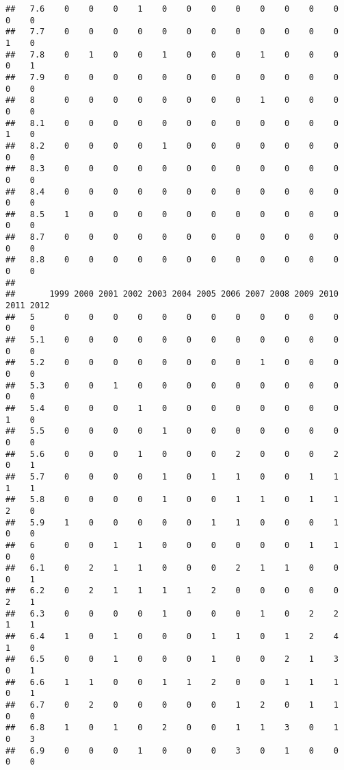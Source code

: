 \documentclass[
]{article}
\begin{document}
\begin{verbatim}
##   7.6    0    0    0    1    0    0    0    0    0    0    0    0    0    0
##   7.7    0    0    0    0    0    0    0    0    0    0    0    0    1    0
##   7.8    0    1    0    0    1    0    0    0    1    0    0    0    0    1
##   7.9    0    0    0    0    0    0    0    0    0    0    0    0    0    0
##   8      0    0    0    0    0    0    0    0    1    0    0    0    0    0
##   8.1    0    0    0    0    0    0    0    0    0    0    0    0    1    0
##   8.2    0    0    0    0    1    0    0    0    0    0    0    0    0    0
##   8.3    0    0    0    0    0    0    0    0    0    0    0    0    0    0
##   8.4    0    0    0    0    0    0    0    0    0    0    0    0    0    0
##   8.5    1    0    0    0    0    0    0    0    0    0    0    0    0    0
##   8.7    0    0    0    0    0    0    0    0    0    0    0    0    0    0
##   8.8    0    0    0    0    0    0    0    0    0    0    0    0    0    0
##      
##       1999 2000 2001 2002 2003 2004 2005 2006 2007 2008 2009 2010 2011 2012
##   5      0    0    0    0    0    0    0    0    0    0    0    0    0    0
##   5.1    0    0    0    0    0    0    0    0    0    0    0    0    0    0
##   5.2    0    0    0    0    0    0    0    0    1    0    0    0    0    0
##   5.3    0    0    1    0    0    0    0    0    0    0    0    0    0    0
##   5.4    0    0    0    1    0    0    0    0    0    0    0    0    1    0
##   5.5    0    0    0    0    1    0    0    0    0    0    0    0    0    0
##   5.6    0    0    0    1    0    0    0    2    0    0    0    2    0    1
##   5.7    0    0    0    0    1    0    1    1    0    0    1    1    1    1
##   5.8    0    0    0    0    1    0    0    1    1    0    1    1    2    0
##   5.9    1    0    0    0    0    0    1    1    0    0    0    1    0    0
##   6      0    0    1    1    0    0    0    0    0    0    1    1    0    0
##   6.1    0    2    1    1    0    0    0    2    1    1    0    0    0    1
##   6.2    0    2    1    1    1    1    2    0    0    0    0    0    2    1
##   6.3    0    0    0    0    1    0    0    0    1    0    2    2    1    1
##   6.4    1    0    1    0    0    0    1    1    0    1    2    4    1    0
##   6.5    0    0    1    0    0    0    1    0    0    2    1    3    0    1
##   6.6    1    1    0    0    1    1    2    0    0    1    1    1    0    1
##   6.7    0    2    0    0    0    0    0    1    2    0    1    1    0    0
##   6.8    1    0    1    0    2    0    0    1    1    3    0    1    0    3
##   6.9    0    0    0    1    0    0    0    3    0    1    0    0    0    0

\end{verbatim}
\end{document}
